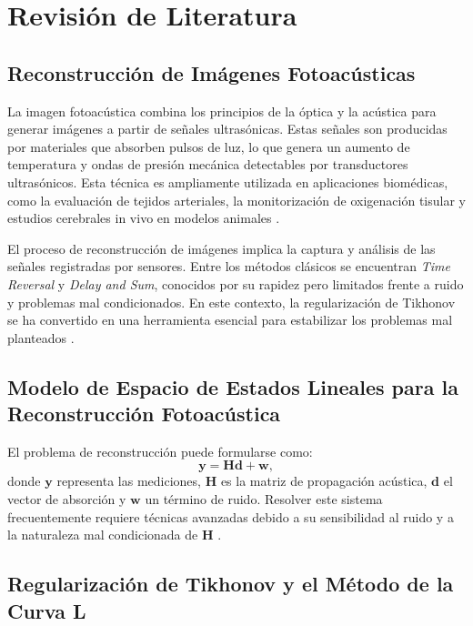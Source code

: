 \section{Revisión de Literatura} \label{sec:lit}

\subsection{Reconstrucción de Imágenes Fotoacústicas} \label{sec:lit:one}

La imagen fotoacústica combina los principios de la óptica y la acústica para generar imágenes a partir de señales ultrasónicas. Estas señales son producidas por materiales que absorben pulsos de luz, lo que genera un aumento de temperatura y ondas de presión mecánica detectables por transductores ultrasónicos. Esta técnica es ampliamente utilizada en aplicaciones biomédicas, como la evaluación de tejidos arteriales, la monitorización de oxigenación tisular y estudios cerebrales in vivo en modelos animales \cite{Xu2015}.

El proceso de reconstrucción de imágenes implica la captura y análisis de las señales registradas por sensores. Entre los métodos clásicos se encuentran \textit{Time Reversal} y \textit{Delay and Sum}, conocidos por su rapidez pero limitados frente a ruido y problemas mal condicionados. En este contexto, la regularización de Tikhonov se ha convertido en una herramienta esencial para estabilizar los problemas mal planteados \cite{Tikhonov1963}.

\subsection{Modelo de Espacio de Estados Lineales para la Reconstrucción Fotoacústica} \label{sec:lit:two}

El problema de reconstrucción puede formularse como:
\begin{equation}
    \mathbf{y} = \mathbf{H} \mathbf{d} + \mathbf{w},
\end{equation}
donde $\mathbf{y}$ representa las mediciones, $\mathbf{H}$ es la matriz de propagación acústica, $\mathbf{d}$ el vector de absorción y $\mathbf{w}$ un término de ruido. Resolver este sistema frecuentemente requiere técnicas avanzadas debido a su sensibilidad al ruido y a la naturaleza mal condicionada de $\mathbf{H}$ \cite{Candes2006}.

\subsection{Regularización de Tikhonov y el Método de la Curva L} \label{sec:lit:tikhonov}


